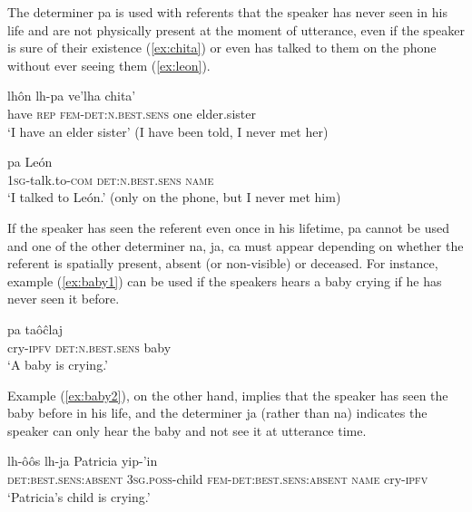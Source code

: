 \documentclass[oneside,a4paper,11pt]{article}
\newcommand{\ipa}[1]{{\phon \mbox{#1}}} %
\begin{document}
  The determiner \ipa{pa} is used with referents that the speaker has never seen in his life and are not physically present at the moment of utterance, even if the speaker is sure of their existence (\ref{ex:chita}) or even has talked to them on the phone without ever seeing them (\ref{ex:leon}).
  
  \begin{exe}
\ex \label{ex:chita}
\gll   \ipa{caaj}  \ipa{lhôn}  \ipa{lh-pa}  \ipa{ve'lha}  \ipa{chita'} \\
have \textsc{rep} \textsc{fem-det:n.best.sens} one elder.sister \\
\glt `I have an elder sister' (I have been told, I never met her)
\end{exe}


\begin{exe}
\ex  \label{ex:leon}
\gll \ipa{ja-yasinôy-esh} \ipa{pa}  \ipa{León} \\
\textsc{1sg}-talk.to-\textsc{com} \textsc{det:n.best.sens} \textsc{name} \\
\glt  `I talked to León.' (only on the phone, but I never met him)
\end{exe}

If the speaker has seen the referent even once in his lifetime, \ipa{pa} cannot be used and one of the other determiner \ipa{na}, \ipa{ja}, \ipa{ca} must appear  depending on whether the referent is  spatially present, absent (or non-visible) or deceased. For instance, example (\ref{ex:baby1}) can be used if the speakers hears a baby crying if he has never seen it before.

\begin{exe}
\ex  \label{ex:baby1}
\gll   \ipa{yip-'in}  \ipa{pa} \ipa{taôĉlaj} \\
cry-\textsc{ipfv} \textsc{det:n.best.sens} baby \\
\glt  `A baby is crying.'
\end{exe}

Example (\ref{ex:baby2}), on the other hand, implies that the speaker has seen the baby before in his life, and the determiner  \ipa{ja} (rather than \ipa{na}) indicates the speaker can only hear the baby and not see it at utterance time.

\begin{exe}
\ex  \label{ex:baby2}
\gll    \ipa{ja} \ipa{lh-ôôs} \ipa{lh-ja} \ipa{Patricia} \ipa{yip-'in} \\
\textsc{det:best.sens:absent} \textsc{3sg.poss}-child \textsc{fem-det:best.sens:absent}
\textsc{name} cry-\textsc{ipfv}  \\
\glt  `Patricia's child is crying.'
\end{exe}
\end{document}
